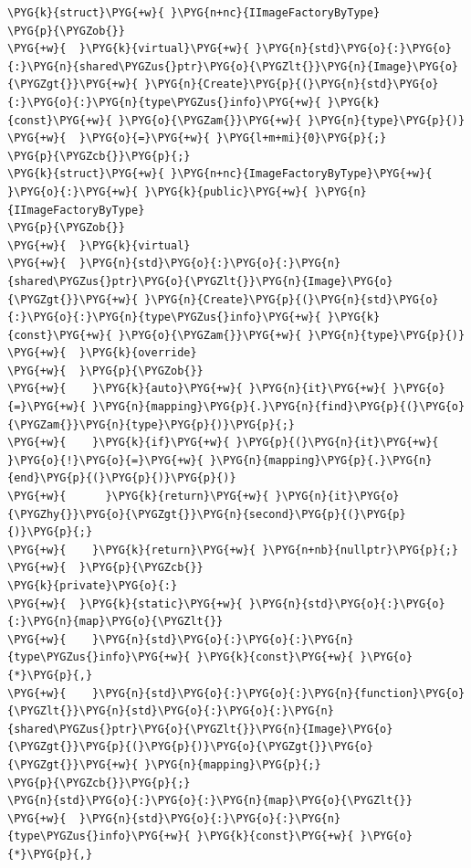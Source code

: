 \begin{codeblockbg}
\begin{Verbatim}[commandchars=\\\{\},breaklines=true,breakanywhere=true,fontsize=\codefont,xleftmargin=17bp]
\PYG{k}{struct}\PYG{+w}{ }\PYG{n+nc}{IImageFactoryByType}
\PYG{p}{\PYGZob{}}
\PYG{+w}{  }\PYG{k}{virtual}\PYG{+w}{ }\PYG{n}{std}\PYG{o}{:}\PYG{o}{:}\PYG{n}{shared\PYGZus{}ptr}\PYG{o}{\PYGZlt{}}\PYG{n}{Image}\PYG{o}{\PYGZgt{}}\PYG{+w}{ }\PYG{n}{Create}\PYG{p}{(}\PYG{n}{std}\PYG{o}{:}\PYG{o}{:}\PYG{n}{type\PYGZus{}info}\PYG{+w}{ }\PYG{k}{const}\PYG{+w}{ }\PYG{o}{\PYGZam{}}\PYG{+w}{ }\PYG{n}{type}\PYG{p}{)}
\PYG{+w}{  }\PYG{o}{=}\PYG{+w}{ }\PYG{l+m+mi}{0}\PYG{p}{;}
\PYG{p}{\PYGZcb{}}\PYG{p}{;}
\PYG{k}{struct}\PYG{+w}{ }\PYG{n+nc}{ImageFactoryByType}\PYG{+w}{ }\PYG{o}{:}\PYG{+w}{ }\PYG{k}{public}\PYG{+w}{ }\PYG{n}{IImageFactoryByType}
\PYG{p}{\PYGZob{}}
\PYG{+w}{  }\PYG{k}{virtual}
\PYG{+w}{  }\PYG{n}{std}\PYG{o}{:}\PYG{o}{:}\PYG{n}{shared\PYGZus{}ptr}\PYG{o}{\PYGZlt{}}\PYG{n}{Image}\PYG{o}{\PYGZgt{}}\PYG{+w}{ }\PYG{n}{Create}\PYG{p}{(}\PYG{n}{std}\PYG{o}{:}\PYG{o}{:}\PYG{n}{type\PYGZus{}info}\PYG{+w}{ }\PYG{k}{const}\PYG{+w}{ }\PYG{o}{\PYGZam{}}\PYG{+w}{ }\PYG{n}{type}\PYG{p}{)}
\PYG{+w}{  }\PYG{k}{override}
\PYG{+w}{  }\PYG{p}{\PYGZob{}}
\PYG{+w}{    }\PYG{k}{auto}\PYG{+w}{ }\PYG{n}{it}\PYG{+w}{ }\PYG{o}{=}\PYG{+w}{ }\PYG{n}{mapping}\PYG{p}{.}\PYG{n}{find}\PYG{p}{(}\PYG{o}{\PYGZam{}}\PYG{n}{type}\PYG{p}{)}\PYG{p}{;}
\PYG{+w}{    }\PYG{k}{if}\PYG{+w}{ }\PYG{p}{(}\PYG{n}{it}\PYG{+w}{ }\PYG{o}{!}\PYG{o}{=}\PYG{+w}{ }\PYG{n}{mapping}\PYG{p}{.}\PYG{n}{end}\PYG{p}{(}\PYG{p}{)}\PYG{p}{)}
\PYG{+w}{      }\PYG{k}{return}\PYG{+w}{ }\PYG{n}{it}\PYG{o}{\PYGZhy{}}\PYG{o}{\PYGZgt{}}\PYG{n}{second}\PYG{p}{(}\PYG{p}{)}\PYG{p}{;}
\PYG{+w}{    }\PYG{k}{return}\PYG{+w}{ }\PYG{n+nb}{nullptr}\PYG{p}{;}
\PYG{+w}{  }\PYG{p}{\PYGZcb{}}
\PYG{k}{private}\PYG{o}{:}
\PYG{+w}{  }\PYG{k}{static}\PYG{+w}{ }\PYG{n}{std}\PYG{o}{:}\PYG{o}{:}\PYG{n}{map}\PYG{o}{\PYGZlt{}}
\PYG{+w}{    }\PYG{n}{std}\PYG{o}{:}\PYG{o}{:}\PYG{n}{type\PYGZus{}info}\PYG{+w}{ }\PYG{k}{const}\PYG{+w}{ }\PYG{o}{*}\PYG{p}{,}
\PYG{+w}{    }\PYG{n}{std}\PYG{o}{:}\PYG{o}{:}\PYG{n}{function}\PYG{o}{\PYGZlt{}}\PYG{n}{std}\PYG{o}{:}\PYG{o}{:}\PYG{n}{shared\PYGZus{}ptr}\PYG{o}{\PYGZlt{}}\PYG{n}{Image}\PYG{o}{\PYGZgt{}}\PYG{p}{(}\PYG{p}{)}\PYG{o}{\PYGZgt{}}\PYG{o}{\PYGZgt{}}\PYG{+w}{ }\PYG{n}{mapping}\PYG{p}{;}
\PYG{p}{\PYGZcb{}}\PYG{p}{;}
\PYG{n}{std}\PYG{o}{:}\PYG{o}{:}\PYG{n}{map}\PYG{o}{\PYGZlt{}}
\PYG{+w}{  }\PYG{n}{std}\PYG{o}{:}\PYG{o}{:}\PYG{n}{type\PYGZus{}info}\PYG{+w}{ }\PYG{k}{const}\PYG{+w}{ }\PYG{o}{*}\PYG{p}{,}

\end{Verbatim}
\end{codeblockbg}
